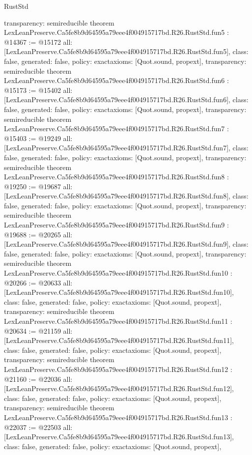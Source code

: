 \begin{lexlean}{RustStd}
\begin{coremodule}
{  transparency: semireducible
}
theorem LexLeanPreserve.Ca5fe8b9d64595a79eee4f004915717bd.R26.RustStd.fun5 : @14367 := @15172 {
  all: [LexLeanPreserve.Ca5fe8b9d64595a79eee4f004915717bd.R26.RustStd.fun5],
  class: false,
  generated: false,
  policy: exact{axioms: [Quot.sound, propext]},
  transparency: semireducible
}
theorem LexLeanPreserve.Ca5fe8b9d64595a79eee4f004915717bd.R26.RustStd.fun6 : @15173 := @15402 {
  all: [LexLeanPreserve.Ca5fe8b9d64595a79eee4f004915717bd.R26.RustStd.fun6],
  class: false,
  generated: false,
  policy: exact{axioms: [Quot.sound, propext]},
  transparency: semireducible
}
theorem LexLeanPreserve.Ca5fe8b9d64595a79eee4f004915717bd.R26.RustStd.fun7 : @15403 := @19249 {
  all: [LexLeanPreserve.Ca5fe8b9d64595a79eee4f004915717bd.R26.RustStd.fun7],
  class: false,
  generated: false,
  policy: exact{axioms: [Quot.sound, propext]},
  transparency: semireducible
}
theorem LexLeanPreserve.Ca5fe8b9d64595a79eee4f004915717bd.R26.RustStd.fun8 : @19250 := @19687 {
  all: [LexLeanPreserve.Ca5fe8b9d64595a79eee4f004915717bd.R26.RustStd.fun8],
  class: false,
  generated: false,
  policy: exact{axioms: [Quot.sound, propext]},
  transparency: semireducible
}
theorem LexLeanPreserve.Ca5fe8b9d64595a79eee4f004915717bd.R26.RustStd.fun9 : @19688 := @20265 {
  all: [LexLeanPreserve.Ca5fe8b9d64595a79eee4f004915717bd.R26.RustStd.fun9],
  class: false,
  generated: false,
  policy: exact{axioms: [Quot.sound, propext]},
  transparency: semireducible
}
theorem LexLeanPreserve.Ca5fe8b9d64595a79eee4f004915717bd.R26.RustStd.fun10 : @20266 := @20633 {
  all: [LexLeanPreserve.Ca5fe8b9d64595a79eee4f004915717bd.R26.RustStd.fun10],
  class: false,
  generated: false,
  policy: exact{axioms: [Quot.sound, propext]},
  transparency: semireducible
}
theorem LexLeanPreserve.Ca5fe8b9d64595a79eee4f004915717bd.R26.RustStd.fun11 : @20634 := @21159 {
  all: [LexLeanPreserve.Ca5fe8b9d64595a79eee4f004915717bd.R26.RustStd.fun11],
  class: false,
  generated: false,
  policy: exact{axioms: [Quot.sound, propext]},
  transparency: semireducible
}
theorem LexLeanPreserve.Ca5fe8b9d64595a79eee4f004915717bd.R26.RustStd.fun12 : @21160 := @22036 {
  all: [LexLeanPreserve.Ca5fe8b9d64595a79eee4f004915717bd.R26.RustStd.fun12],
  class: false,
  generated: false,
  policy: exact{axioms: [Quot.sound, propext]},
  transparency: semireducible
}
theorem LexLeanPreserve.Ca5fe8b9d64595a79eee4f004915717bd.R26.RustStd.fun13 : @22037 := @22503 {
  all: [LexLeanPreserve.Ca5fe8b9d64595a79eee4f004915717bd.R26.RustStd.fun13],
  class: false,
  generated: false,
  policy: exact{axioms: [Quot.sound, propext]},
}
\end{coremodule}
\end{lexlean}
